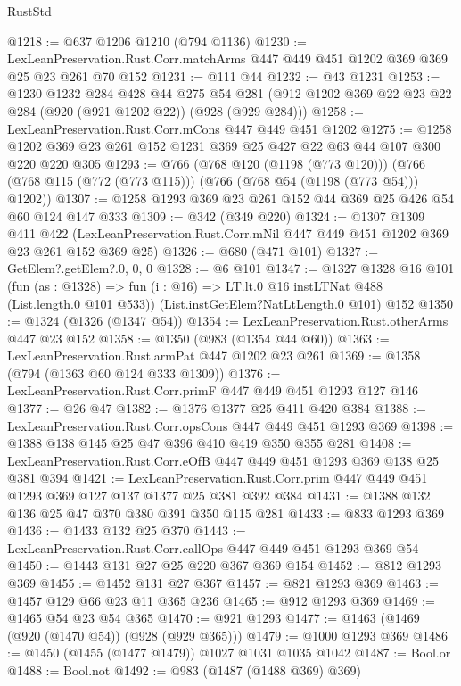 \begin{lexlean}{RustStd}
\begin{coremodule}
{\begin{coremodule}
{{{{{{@1218 := @637 @1206 @1210 (@794 @1136)
@1230 := LexLeanPreservation.Rust.Corr.matchArms
    @447
    @449
    @451
    @1202
    @369
    @369
    @25
    @23
    @261
    @70
    @152
@1231 := @111 @44
@1232 := @43 @1231
@1253 := @1230
    @1232
    @284
    @428
    @44
    @275
    @54
    @281
    (@912 @1202 @369 @22 @23 @22 @284 (@920 (@921 @1202 @22)) (@928 (@929 @284)))
@1258 := LexLeanPreservation.Rust.Corr.mCons @447 @449 @451 @1202
@1275 := @1258 @1202 @369 @23 @261 @152 @1231 @369 @25 @427 @22 @63 @44 @107 @300 @220 @220 @305
@1293 := @766
    (@768 @120 (@1198 (@773 @120)))
    (@766 (@768 @115 (@772 (@773 @115))) (@766 (@768 @54 (@1198 (@773 @54))) @1202))
@1307 := @1258 @1293 @369 @23 @261 @152 @44 @369 @25 @426 @54 @60 @124 @147 @333
@1309 := @342 (@349 @220)
@1324 := @1307
    @1309
    @411
    @422
    (LexLeanPreservation.Rust.Corr.mNil @447 @449 @451 @1202 @369 @23 @261 @152 @369 @25)
@1326 := @680 (@471 @101)
@1327 := GetElem?.getElem?.{0, 0, 0}
@1328 := @6 @101
@1347 := @1327
    @1328
    @16
    @101
    (fun (as : @1328) => fun (i : @16) => LT.lt.{0} @16 instLTNat @488 (List.length.{0} @101 @533))
    (List.instGetElem?NatLtLength.{0} @101)
    @152
@1350 := @1324 (@1326 (@1347 @54))
@1354 := LexLeanPreservation.Rust.otherArms @447 @23 @152
@1358 := @1350 (@983 (@1354 @44 @60))
@1363 := LexLeanPreservation.Rust.armPat @447 @1202 @23 @261
@1369 := @1358 (@794 (@1363 @60 @124 @333 @1309))
@1376 := LexLeanPreservation.Rust.Corr.primF @447 @449 @451 @1293 @127 @146
@1377 := @26 @47
@1382 := @1376 @1377 @25 @411 @420 @384
@1388 := LexLeanPreservation.Rust.Corr.opsCons @447 @449 @451 @1293 @369
@1398 := @1388 @138 @145 @25 @47 @396 @410 @419 @350 @355 @281
@1408 := LexLeanPreservation.Rust.Corr.eOfB @447 @449 @451 @1293 @369 @138 @25 @381 @394
@1421 := LexLeanPreservation.Rust.Corr.prim
    @447
    @449
    @451
    @1293
    @369
    @127
    @137
    @1377
    @25
    @381
    @392
    @384
@1431 := @1388 @132 @136 @25 @47 @370 @380 @391 @350 @115 @281
@1433 := @833 @1293 @369
@1436 := @1433 @132 @25 @370
@1443 := LexLeanPreservation.Rust.Corr.callOps @447 @449 @451 @1293 @369 @54
@1450 := @1443 @131 @27 @25 @220 @367 @369 @154
@1452 := @812 @1293 @369
@1455 := @1452 @131 @27 @367
@1457 := @821 @1293 @369
@1463 := @1457 @129 @66 @23 @11 @365 @236
@1465 := @912 @1293 @369
@1469 := @1465 @54 @23 @54 @365
@1470 := @921 @1293
@1477 := @1463 (@1469 (@920 (@1470 @54)) (@928 (@929 @365)))
@1479 := @1000 @1293 @369
@1486 := @1450 (@1455 (@1477 @1479)) @1027 @1031 @1035 @1042
@1487 := Bool.or
@1488 := Bool.not
@1492 := @983 (@1487 (@1488 @369) @369)
}}}}}}
\end{coremodule}}
\end{coremodule}
\end{lexlean}

